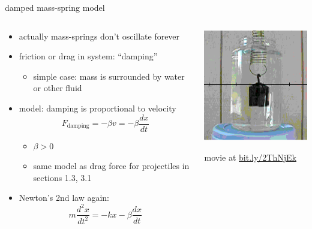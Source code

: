 \documentclass[urlcolor=blue]{beamer}
\begin{document}
\begin{frame}{damped mass-spring model}

\begin{columns}
\begin{column}{0.7\textwidth}
\begin{itemize}
\small
\item actually mass-springs don't oscillate forever
\item friction or drag in system: ``damping''
    \begin{itemize}
    \item simple case: mass is surrounded by water or other fluid
    \end{itemize}
\item model: damping is proportional to velocity
$$F_{\text{damping}} = - \beta v = - \beta \frac{dx}{dt}$$

\vspace{-2mm}
    \begin{itemize}
    \item $\beta > 0$
    \item same model as drag force for projectiles in sections 1.3, 3.1
    \end{itemize}
\item Newton's 2nd law again:
    $$\boxed{m \frac{d^2x}{dt^2} = - k x - \beta \frac{dx}{dt}}$$
\end{itemize}
\end{column}
\begin{column}{0.3\textwidth}
\includegraphics[width=1.1\textwidth]{figs/dampedmassspring}

\scriptsize movie at \href{https://bit.ly/2ThNjEk}{bit.ly/2ThNjEk}
\end{column}
\end{columns}
\end{frame}
\end{document}

